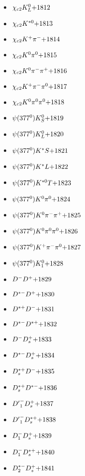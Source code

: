 \begin{multicols}{3}
\begin{itemize}
 \item $ \chi_{c2} K_{L}^{0} \hfill{+1812}$
 \item $ \chi_{c2} K^{*0} \hfill{+1813}$
 \item $ \chi_{c2} K^{+} \pi^{-} \hfill{+1814}$
 \item $ \chi_{c2} K^{0} \pi^{0} \hfill{+1815}$
 \item $ \chi_{c2} K^{0} \pi^{-} \pi^{+} \hfill{+1816}$
 \item $ \chi_{c2} K^{+} \pi^{-} \pi^{0} \hfill{+1817}$
 \item $ \chi_{c2} K^{0} \pi^{0} \pi^{0} \hfill{+1818}$
 \item $ \psi(377^{0}) K_{S}^{0} \hfill{+1819}$
 \item $ \psi(377^{0}) K_{L}^{0} \hfill{+1820}$
 \item $ \psi(377^{0}) K^{*}S \hfill{+1821}$
 \item $ \psi(377^{0}) K^{*}L \hfill{+1822}$
 \item $ \psi(377^{0}) K^{*0}T \hfill{+1823}$
 \item $ \psi(377^{0}) K^{0} \pi^{0} \hfill{+1824}$
 \item $ \psi(377^{0}) K^{0} \pi^{-} \pi^{+} \hfill{+1825}$
 \item $ \psi(377^{0}) K^{0} \pi^{0} \pi^{0} \hfill{+1826}$
 \item $ \psi(377^{0}) K^{+} \pi^{-} \pi^{0} \hfill{+1827}$
 \item $ \psi(377^{0}) K_{1}^{0} \hfill{+1828}$
 \item $ D^{-} D^{+} \hfill{+1829}$
 \item $ D^{*-} D^{+} \hfill{+1830}$
 \item $ D^{*+} D^{-} \hfill{+1831}$
 \item $ D^{*-} D^{*+} \hfill{+1832}$
 \item $ D^{-} D_{s}^{+} \hfill{+1833}$
 \item $ D^{*-} D_{s}^{+} \hfill{+1834}$
 \item $ D_{s}^{*+} D^{-} \hfill{+1835}$
 \item $ D_{s}^{*+} D^{*-} \hfill{+1836}$
 \item $ {D^{\prime}}_{1}^{-} D_{s}^{+} \hfill{+1837}$
 \item $ {D^{\prime}}_{1}^{-} D_{s}^{*+} \hfill{+1838}$
 \item $ D_{1}^{-} D_{s}^{+} \hfill{+1839}$
 \item $ D_{1}^{-} D_{s}^{*+} \hfill{+1840}$
 \item $ D_{2}^{*-} D_{s}^{+} \hfill{+1841}$

\end{itemize}
\end{multicols}
